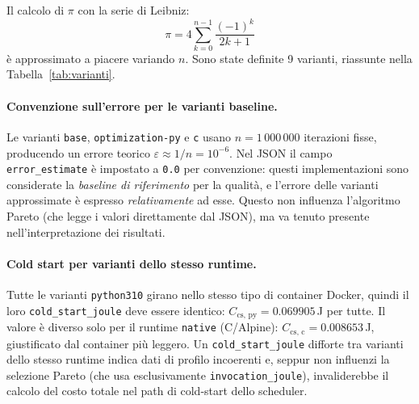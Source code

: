 \documentclass[a4paper,12pt]{article}
\begin{document}
Il calcolo di $\pi$ con la serie di Leibniz:
\begin{equation}
  \pi = 4\sum_{k=0}^{n-1} \frac{(-1)^k}{2k+1}
\end{equation}
è approssimato a piacere variando $n$.  Sono state definite 9 varianti,
riassunte nella Tabella~\ref{tab:varianti}.

\paragraph{Convenzione sull'errore per le varianti baseline.}
Le varianti \texttt{base}, \texttt{optimization-py} e \texttt{c} usano
$n = 1\,000\,000$ iterazioni fisse, producendo un errore teorico
$\varepsilon \approx 1/n = 10^{-6}$.
Nel JSON il campo \texttt{error\_estimate} è impostato a \texttt{0.0} per
convenzione: questi implementazioni sono considerate la
\emph{baseline di riferimento} per la qualità, e l'errore delle varianti
approssimate è espresso \emph{relativamente} ad esse.
Questo non influenza l'algoritmo Pareto (che legge i valori direttamente
dal JSON), ma va tenuto presente nell'interpretazione dei risultati.

\paragraph{Cold start per varianti dello stesso runtime.}
Tutte le varianti \texttt{python310} girano nello stesso tipo di container
Docker, quindi il loro \texttt{cold\_start\_joule} deve essere identico:
$C_{\text{cs, py}} = 0.069905$\,J per tutte.
Il valore è diverso solo per il runtime \texttt{native} (C/Alpine):
$C_{\text{cs, c}} = 0.008653$\,J, giustificato dal container più leggero.
Un \texttt{cold\_start\_joule} difforte tra varianti dello stesso runtime
indica dati di profilo incoerenti e, seppur non influenzi la selezione
Pareto (che usa esclusivamente \texttt{invocation\_joule}), invaliderebbe
il calcolo del costo totale nel path di cold-start dello scheduler.
\end{document}
